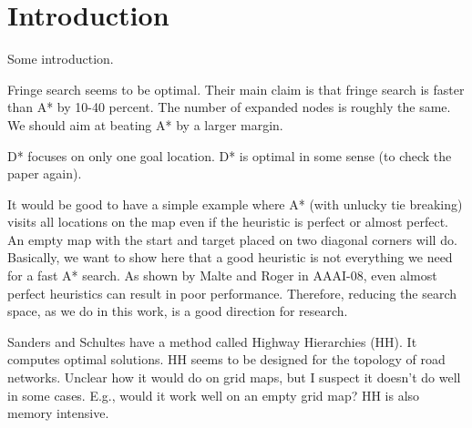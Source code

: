 
\section{Introduction}
\label{introduction}

Some introduction.

Fringe search seems to be optimal. Their main claim is that fringe search is faster than A* by 10-40 percent. The number of expanded nodes is roughly the same. We should aim at beating A* by a larger margin.

D* focuses on only one goal location. D* is optimal in some sense (to check the paper again).

It would be good to have a simple example where A* (with unlucky tie breaking) visits all locations on the map even if the heuristic is perfect or almost perfect. An empty map with the start and target placed on two diagonal corners will do. Basically, we want to show here that a good heuristic is not everything we need for a fast A* search. As shown by Malte and Roger in AAAI-08, even almost perfect heuristics can result in poor performance. Therefore, reducing the search space, as we do in this work, is a good direction for research.

Sanders and Schultes have a method called Highway Hierarchies (HH). It computes optimal solutions. 
HH seems to be designed for the topology of road networks. Unclear how it would do on grid maps, but I suspect it doesn't do well in some cases. E.g., would it work well on an empty grid map? HH is also memory intensive.

